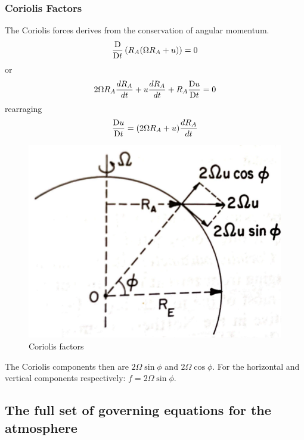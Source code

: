
\subsubsection{Coriolis Factors}\label{subsubsec:coriolis-factors}
The Coriolis forces derives from the conservation of angular momentum.
\[\frac{\mathrm{D} }{\mathrm{D}t}\left(R_A(\Omega R_A+u)\right)=0\]
or
\[2\Omega R_A\frac{dR_A}{dt}+u\frac{dR_A}{dt}+R_A\frac{\mathrm{D} u}{\mathrm{D}t}=0\]
rearraging
\[\frac{\mathrm{D} u}{\mathrm{D}t}=(2\Omega R_A+u)\frac{dR_A}{dt}\]
\begin{figure}[h!]
	\centering
	\includegraphics[width=0.35\linewidth]{uploads/Screenshot 2024-11-21 164025.png}
	\caption{Coriolis factors}
	\label{fig:coriolis-factors}
\end{figure}
The Coriolis components then are $2\Omega\sin\phi$ and $2\Omega\cos\phi$. For the horizontal and vertical components respectively:
$f=2\Omega\sin\phi$.

\subsection{The full set of governing equations for the atmosphere}
\label{subsec:governing-eqs-atm}


